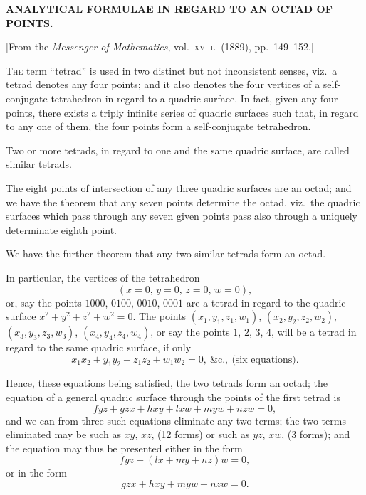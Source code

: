 \documentclass[11pt,a4paper]{book}
\begin{document}
\begin{center}
\textbf{ANALYTICAL FORMULAE IN REGARD TO AN OCTAD OF POINTS.}
\end{center}

\begin{center}
[From the \textit{Messenger of Mathematics}, vol.\ \textsc{xviii}.\ (1889), pp.\ 149--152.]
\end{center}

\textsc{The} term ``tetrad'' is used in two distinct but not inconsistent senses, viz.\ a tetrad denotes any four points; and it also denotes the four vertices of a self-conjugate tetrahedron in regard to a quadric surface. In fact, given any four points, there exists a triply infinite series of quadric surfaces such that, in regard to any one of them, the four points form a self-conjugate tetrahedron.

Two or more tetrads, in regard to one and the same quadric surface, are called similar tetrads.

The eight points of intersection of any three quadric surfaces are an octad; and we have the theorem that any seven points determine the octad, viz.\ the quadric surfaces which pass through any seven given points pass also through a uniquely determinate eighth point.

We have the further theorem that any two similar tetrads form an octad.

In particular, the vertices of the tetrahedron
\[ (x=0,\, y=0,\, z=0,\, w=0), \]
or, say the points $1000$, $0100$, $0010$, $0001$ are a tetrad in regard to the quadric surface $x^2 + y^2 + z^2 + w^2 = 0$. The points $(x_1, y_1, z_1, w_1)$, $(x_2, y_2, z_2, w_2)$, $(x_3, y_3, z_3, w_3)$, $(x_4, y_4, z_4, w_4)$, or say the points $1$, $2$, $3$, $4$, will be a tetrad in regard to the same quadric surface, if only
\[ x_1x_2 + y_1y_2 + z_1z_2 + w_1w_2 = 0,\ \&\text{c.},\ \text{(six equations)}. \]

Hence, these equations being satisfied, the two tetrads form an octad; the equation of a general quadric surface through the points of the first tetrad is
\[ fyz + gzx + hxy + lxw + myw + nzw = 0, \]
and we can from three such equations eliminate any two terms; the two terms eliminated may be such as $xy$, $xz$, (12 forms) or such as $yz$, $xw$, (3 forms); and the equation may thus be presented either in the form
\[ fyz + (lx + my + nz)w = 0, \]
or in the form
\[ gzx + hxy + myw + nzw = 0. \]
\end{document}
